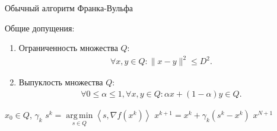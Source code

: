 \documentclass{beamer}
\DeclareMathOperator*{\argmin}{arg\,min}
\begin{document}

\begin{frame}{Обычный алгоритм Франка-Вульфа}

    Общие допущения:
    \begin{enumerate}
        \item Ограниченность множества $Q$:
            \begin{align*}
                \forall x, y \in Q: \|x - y\|^2 \leq D^2.
            \end{align*}
        \item Выпуклость множества $Q$:
            \begin{align*}
                \forall 0 \leq \alpha \leq 1, \forall x, y \in Q: \alpha x + (1 - \alpha) y \in Q.
            \end{align*}
    \end{enumerate}

    \begin{algorithm}[H]
        \caption{}
        \begin{algorithmic}[1]
             $x_0 \in Q$, $\gamma_k$
                \State $s^k = \argmin\limits_{s \in Q}  \left<s, \nabla f(x^k) \right>$
                \State $x^{k+1} = x^k + \gamma_k (s^k - x^k)$
            \EndFor
             $x^{N + 1}$ 
        \end{algorithmic}
    \end{algorithm}

\end{frame}

\end{document}
